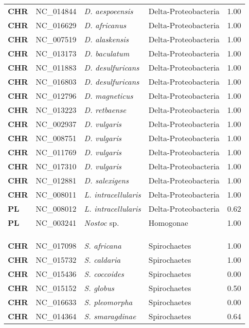 \begin{adjustwidth}{-3cm}{2cm}
{\begin{supertabular}{>{\bfseries}l|p{0.1\textwidth}p{0.14\textwidth}l|l}
CHR & NC\_014844 & \textit{D. aespoeensis} & Delta-Proteobacteria & 1.00\\
CHR & NC\_016629 & \textit{D. africanus} & Delta-Proteobacteria & 1.00\\
CHR & NC\_007519 & \textit{D. alaskensis} & Delta-Proteobacteria & 1.00\\
CHR & NC\_013173 & \textit{D. baculatum} & Delta-Proteobacteria & 1.00\\
CHR & NC\_011883 & \textit{D. desulfuricans} & Delta-Proteobacteria & 1.00\\
CHR & NC\_016803 & \textit{D. desulfuricans} & Delta-Proteobacteria & 1.00\\
CHR & NC\_012796 & \textit{D. magneticus} & Delta-Proteobacteria & 1.00\\
CHR & NC\_013223 & \textit{D. retbaense} & Delta-Proteobacteria & 1.00\\
CHR & NC\_002937 & \textit{D. vulgaris} & Delta-Proteobacteria & 1.00\\
CHR & NC\_008751 & \textit{D. vulgaris} & Delta-Proteobacteria & 1.00\\
CHR & NC\_011769 & \textit{D. vulgaris} & Delta-Proteobacteria & 1.00\\
CHR & NC\_017310 & \textit{D. vulgaris} & Delta-Proteobacteria & 1.00\\
CHR & NC\_012881 & \textit{D. salexigens} & Delta-Proteobacteria & 1.00\\
CHR & NC\_008011 & \textit{L. intracellularis} & Delta-Proteobacteria & 1.00\\
PL & NC\_008012 & \textit{L. intracellularis} & Delta-Proteobacteria & 0.62\\
PL & NC\_003241 & \textit{Nostoc} sp. & Homogonae & 1.00\\
\\
\\
\hline\\
CHR & NC\_017098 & \textit{S. africana} & Spirochaetes & 1.00\\
CHR & NC\_015732 & \textit{S. caldaria} & Spirochaetes & 1.00\\
CHR & NC\_015436 & \textit{S. coccoides} & Spirochaetes & 0.00\\
CHR & NC\_015152 & \textit{S. globus} & Spirochaetes & 0.50\\
CHR & NC\_016633 & \textit{S. pleomorpha} & Spirochaetes & 0.00\\
CHR & NC\_014364 & \textit{S. smaragdinae} & Spirochaetes & 0.64\\

\end{supertabular}}
\end{adjustwidth}
